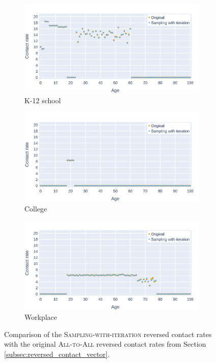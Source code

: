 \begin{figure}
    \centering
    \begin{subfigure}{.8\linewidth}
        \centering
        \includegraphics[width=\textwidth]{4 - Sampling/fig/sampling_with_iteration/swi_vs_standard_reverse_cr_k12school.png}
        \caption{K-12 school}
        \label{fig:swi_vs_standard_reversed_cr_k12school}
    \end{subfigure}
    \begin{subfigure}{.8\linewidth}
        \centering
        \includegraphics[width=\textwidth]{4 - Sampling/fig/sampling_with_iteration/swi_vs_standard_reverse_cr_college.png}
        \caption{College}
        \label{fig:swi_vs_standard_reversed_cr_college}
    \end{subfigure}
    \begin{subfigure}{.8\linewidth}
        \centering
        \includegraphics[width=\textwidth]{4 - Sampling/fig/sampling_with_iteration/swi_vs_standard_reverse_cr_workplace.png}
        \caption{Workplace}
        \label{fig:swi_vs_standard_reversed_cr_workplace}
    \end{subfigure}
    \caption{Comparison of the \textsc{Sampling-with-iteration} reversed contact rates with the original \textsc{All-to-All} reversed contact rates from Section \ref{subsec:reversed_contact_vector}.}
\end{figure}
